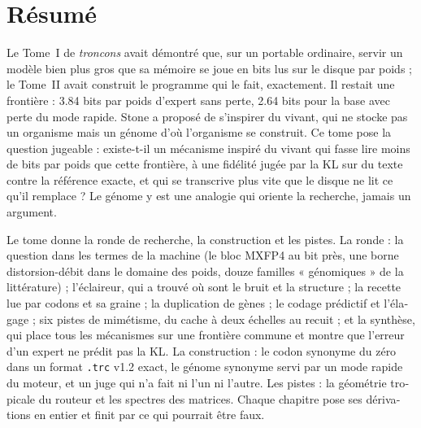 \chapter*{Résumé}
\begin{otherlanguage}{french}
Le Tome~I de \emph{troncons} avait démontré que, sur un portable ordinaire, servir un modèle bien plus gros que sa mémoire se joue en bits lus sur le disque par poids ; le Tome~II avait construit le programme qui le fait, exactement. Il restait une frontière : \num{3.84} bits par poids d'expert sans perte, \num{2.64} bits pour la base avec perte du mode rapide. Stone a proposé de s'inspirer du vivant, qui ne stocke pas un organisme mais un génome d'où l'organisme se construit. Ce tome pose la question jugeable : existe-t-il un mécanisme inspiré du vivant qui fasse lire moins de bits par poids que cette frontière, à une fidélité jugée par la KL sur du texte contre la référence exacte, et qui se transcrive plus vite que le disque ne lit ce qu'il remplace ? Le génome y est une analogie qui oriente la recherche, jamais un argument.

Le tome donne la ronde de recherche, la construction et les pistes. La ronde : la question dans les termes de la machine (le bloc MXFP4 au bit près, une borne distorsion-débit dans le domaine des poids, douze familles « génomiques » de la littérature) ; l'éclaireur, qui a trouvé où sont le bruit et la structure ; la recette lue par codons et sa graine ; la duplication de gènes ; le codage prédictif et l'élagage ; six pistes de mimétisme, du cache à deux échelles au recuit ; et la synthèse, qui place tous les mécanismes sur une frontière commune et montre que l'erreur d'un expert ne prédit pas la KL. La construction : le codon synonyme du zéro dans un format \texttt{.trc} v1.2 exact, le génome synonyme servi par un mode rapide du moteur, et un juge qui n'a fait ni l'un ni l'autre. Les pistes : la géométrie tropicale du routeur et les spectres des matrices. Chaque chapitre pose ses dérivations en entier et finit par ce qui pourrait être faux.


\end{otherlanguage}
